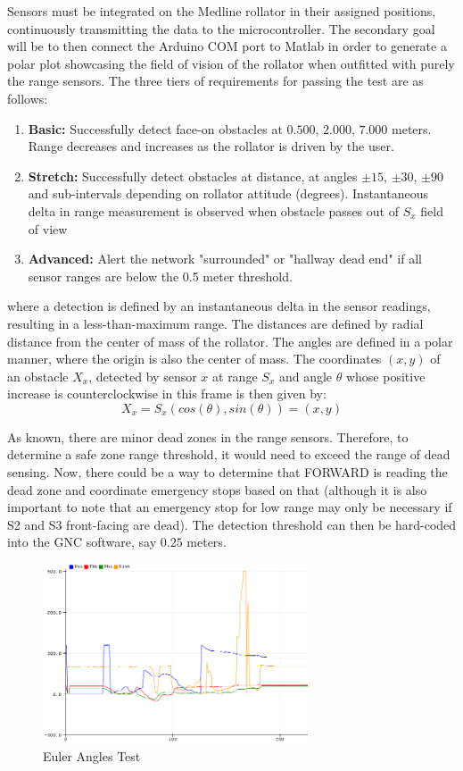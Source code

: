 \noindent Sensors must be integrated on the Medline rollator in their assigned positions, continuously transmitting the data to the microcontroller. The secondary goal will be to then connect the Arduino COM port to Matlab in order to generate a polar plot showcasing the field of vision of the rollator when outfitted with purely the range sensors. The three tiers of requirements for passing the test are as follows:
\begin{enumerate}
	\item \textbf{Basic:} Successfully detect face-on obstacles at $0.500$, $2.000$, $7.000$ meters. Range decreases and increases as the rollator is driven by the user.
	\item \textbf{Stretch:} Successfully detect obstacles at distance, at angles $\pm 15$, $\pm 30$, $\pm 90$ and sub-intervals depending on rollator attitude (degrees). Instantaneous delta in range measurement is observed when obstacle passes out of $S_x$ field of view
	\item \textbf{Advanced:} Alert the network "surrounded" or "hallway dead end" if all sensor ranges are below the 0.5 meter threshold.
\end{enumerate}
where a detection is defined by an instantaneous delta in the sensor readings, resulting in a less-than-maximum range. The distances are defined by radial distance from the center of mass of the rollator. The angles are defined in a polar manner, where the origin is also the center of mass. The coordinates $(x,y)$ of an obstacle $X_x$, detected by sensor $x$ at range $S_x$ and angle $\theta$ whose positive increase is counterclockwise in this frame is then given by:
$$X_x = S_x(cos(\theta), sin(\theta)) = (x,y)$$

\noindent As known, there are minor dead zones in the range sensors. Therefore, to determine a safe zone range threshold, it would need to exceed the range of dead sensing. Now, there could be a way to determine that FORWARD is reading the dead zone and coordinate emergency stops based on that (although it is also important to note that an emergency stop for low range may only be necessary if S2 and S3 front-facing are dead). The detection threshold can then be hard-coded into the GNC software, say $0.25$ meters.\\

\begin{figure}[H]
	\centering
	\includegraphics[width=0.7\textwidth]{./Images/serial-plotter.png}
	\caption{\label{fig:euler-test}Euler Angles Test}
\end{figure}

